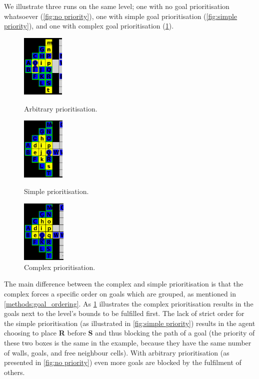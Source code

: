 We illustrate three runs on the same level; 
one with no goal prioritisation whatsoever (\cref{fig:no priority}),
one with simple goal prioritisation (\cref{fig:simple priority}), and 
one with complex goal prioritisation (\cref{fig:complex_priority}). 

\begin{figure}[h!]
  \centering
  \begin{minipage}{.30\columnwidth}
    \centering
    \includegraphics[height=3cm]{graphics/no_priority_block.png}
    \caption{\label{fig:no priority}Arbi\-tra\-ry prioritisation.}
  \end{minipage}%
  \hspace{10pt}%
  \begin{minipage}{.30\columnwidth}
    \centering
    \includegraphics[height=3cm]{graphics/simple_priority_block.PNG}
    \caption{\label{fig:simple priority}Simple prioritisation.}
  \end{minipage}%
  \hspace{10pt}%
  \begin{minipage}{.30\columnwidth}
    \centering
    \includegraphics[height=3cm]{graphics/complex_priority.png}
    \caption{\label{fig:complex_priority}Comp\-lex prioritisation.}
  \end{minipage}
\end{figure}

The main difference between the complex and simple prioritisation is that the complex forces a specific order on goals which are grouped, as mentioned in \cref{methods:goal_ordering}.
As \cref{fig:complex_priority} illustrates the complex prioritisation results in the goals next to the level's bounds to be fulfilled first. 
The lack of strict order for the simple prioritisation (as illustrated in \cref{fig:simple priority}) results in the agent choosing to place \textbf{R} before \textbf{S} and thus blocking the path of a goal (the priority of these two boxes is the same in the example, because they have the same number of walls, goals, and free neighbour cells).
With arbitrary prioritisation (as presented in \cref{fig:no priority}) even more goals are blocked by the fulfilment of others.

